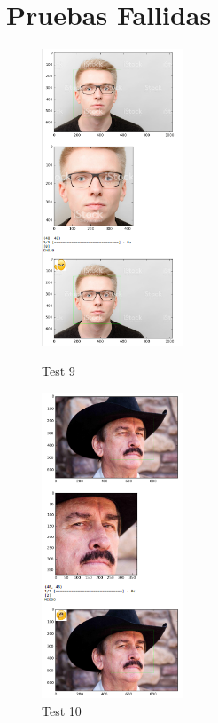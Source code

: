 \section{Pruebas Fallidas}
\begin{frame}


\begin{figure}[!htbp]
    
    \begin{multicols}{2}
     \includegraphics[angle=0,width=42mm]{Imagenes/test9.png}
       \caption{Test 9}
       \label{fig:test9}   
       
       \includegraphics[angle=0,width=42mm]{Imagenes/test10.png}
           \caption{Test 10}
          
           \label{fig:test10} 
           

\end{multicols}
\end{figure}
\end{frame}
